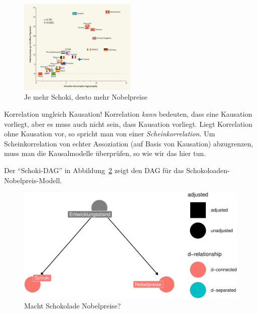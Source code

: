 \documentclass[
  a4paper,
  DIV=11]{scrreprt}
\theoremstyle{definition}
\theoremstyle{remark}
\begin{document}
\begin{figure}

{\centering \includegraphics[width=0.5\textwidth,height=\textheight]{./img/correlation_550.png}

}

\caption{\label{fig-schoki}Je mehr Schoki, desto mehr Nobelpreise}

\end{figure}

\begin{tcolorbox}[enhanced jigsaw, title=\textcolor{quarto-callout-important-color}{\faExclamation}\hspace{0.5em}{Wichtig}, bottomtitle=1mm, bottomrule=.15mm, titlerule=0mm, colbacktitle=quarto-callout-important-color!10!white, colframe=quarto-callout-important-color-frame, leftrule=.75mm, left=2mm, toprule=.15mm, colback=white, arc=.35mm, breakable, toptitle=1mm, opacityback=0, rightrule=.15mm, coltitle=black, opacitybacktitle=0.6]

Korrelation ungleich Kausation! Korrelation \emph{kann} bedeuten, dass
eine Kausation vorliegt, aber es muss auch nicht sein, dass Kausation
vorliegt. Liegt Korrelation ohne Kausation vor, so spricht man von einer
\emph{Scheinkorrelation}. Um Scheinkorrelation von echter Assoziation
(auf Basis von Kausation) abzugrenzen, muss man die Kausalmodelle
überprüfen, so wie wir das hier tun.

\end{tcolorbox}

Der ``Schoki-DAG'' in Abbildung~\ref{fig-schoki-dag} zeigt den DAG für
das Schokoloaden-Nobelpreis-Modell.

\begin{figure}

{\centering \includegraphics{./kausal_files/figure-pdf/fig-schoki-dag-1.pdf}

}

\caption{\label{fig-schoki-dag}Macht Schokolade Nobelpreise?}

\end{figure}
\end{document}
